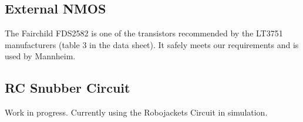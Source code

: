 \documentclass{article}
\begin{document}
	\subsection{External NMOS}
	The Fairchild FDS2582 is one of the transistors recommended by the LT3751 manufacturers (table 3 in the data sheet). It safely meets our requirements and is used by Mannheim.
	\subsection{RC Snubber Circuit}
	Work in progress. Currently using the Robojackets Circuit in simulation.
\end{document}
